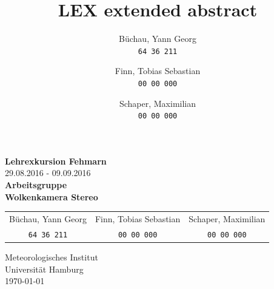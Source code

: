 \documentclass[a4paper,11pt,twoside,german]{article}
\title{LEX extended abstract}
\author{
    Büchau, Yann Georg \\
    \small{\texttt{64\,36\,211}}
    \and
    Finn, Tobias Sebastian \\
    \small{\texttt{00\,00\,000}}
    \and 
    Schaper, Maximilian \\
    \small{\texttt{00\,00\,000}}
    }
\newcommand{\smallborder}{2cm}
\newcommand{\topborder}{1cm}
\newcommand{\bottomborder}{1cm}
\begin{document}
\raggedbottom



\hypersetup{pageanchor=false}
\makeatletter
\begin{titlepage}



\vspace*{\fill}
\begin{center}
\Large{\textbf{Lehrexkursion Fehmarn}}\\
\large{29.08.2016 - 09.09.2016}\\
\vspace{5mm}
\Large{\textbf{Arbeitsgruppe\\Wolkenkamera Stereo}}\\
\vspace{1cm}

\begin{large}
\begin{tabular}{ccc}
Büchau, Yann Georg & Finn, Tobias Sebastian & Schaper, Maximilian \\
\small{\texttt{64\,36\,211}} & 
\small{\texttt{00\,00\,000}} &
\small{\texttt{00\,00\,000}}
\end{tabular}
\end{large}

\vspace{1cm}
\large{Meteorologisches Institut}\\
\large{Universität Hamburg}\\
\vspace{1cm}
\large{{\today}}
\end{center}
\vspace*{\fill}

\clearpage


\end{titlepage}
\makeatother
\hypersetup{pageanchor=true}

\newpage

\clearpage
\setcounter{page}{1} %

\tableofcontents %
\vspace*{\fill}

\listoftables %
\end{document}
